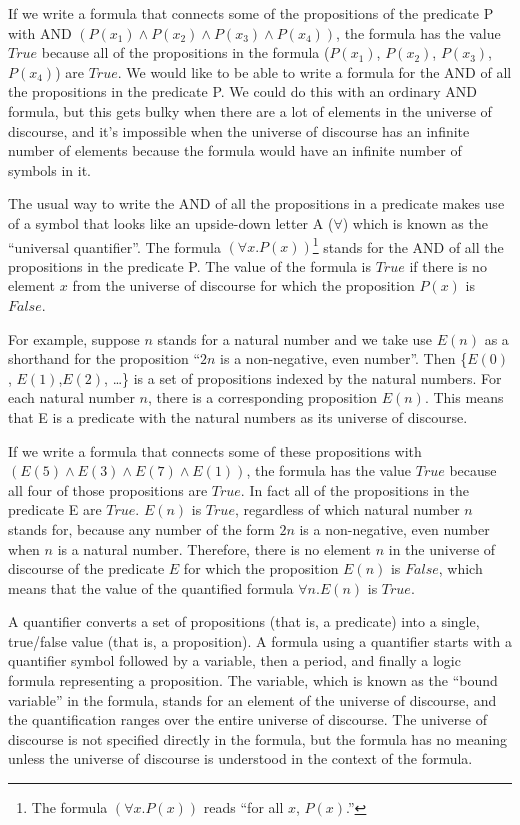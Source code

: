{If we write a formula that connects some of the propositions
of the predicate P with AND
$(P(x_1) \wedge P(x_2) \wedge P(x_3) \wedge P(x_4))$,
the formula has the value $True$
because all of the propositions in the formula ($P(x_1)$, $P(x_2)$, $P(x_3)$, $P(x_4)$)
are $True$.
We would like to be able to write a formula
for the AND of all the propositions in the predicate P.
We could do this with an ordinary AND formula,
but this gets bulky when there are a lot of elements
in the universe of discourse,
and it's impossible when the universe of discourse
has an infinite number of elements because the
formula would have an infinite number of symbols in it.

The usual way to write the AND of all the propositions in a predicate
makes use of a symbol that looks like an upside-down letter A ($\forall$)
which is known as the
\label{def:universal-quantifier}
``universal quantifier''.
The  formula $(\forall x.P(x))$\footnote{The
formula $(\forall x. P(x))$ reads ``for all $x$, $P(x)$.''}
stands for the AND of all the propositions in the predicate P.
The value of the formula is $True$
if there is no element $x$ from the universe of discourse
for which the proposition $P(x)$ is $False$.

For example, suppose $n$ stands for a natural number
and we take use
$E(n)$ as a shorthand for the proposition ``$2n$ is a non-negative, even number''.
Then \{$E(0)$, $E(1)$,$E(2)$, \dots\}
is a set of propositions indexed by the natural numbers.
For each natural number $n$, there is a corresponding proposition $E(n)$.
This means that E is a predicate with the natural numbers
as its universe of discourse.

If we write a formula that connects some of these propositions with
$(E(5) \wedge E(3) \wedge E(7) \wedge E(1))$,
the formula has the value $True$
because all four of those propositions are $True$.
In fact all of the propositions in the predicate E are $True$.
$E(n)$ is $True$, regardless of which natural number $n$ stands for,
because any number of the form $2n$ is a non-negative, even number
when $n$ is a natural number.
Therefore, there is no element $n$ in the universe of discourse of
the predicate $E$ for which the proposition $E(n)$ is $False$,
which means that the value of the quantified formula $\forall n.E(n)$
is $True$.

A
\label{def:quantifier}
quantifier converts a set of propositions (that is, a predicate)
into a single, true/false value (that is, a proposition).
A formula using a quantifier starts with a quantifier symbol followed by
a variable, then a period, and finally a logic formula
representing a proposition. The variable,
which is known as the
\label{def:bound-variable}
``bound variable'' in the formula, stands for an
element of the universe of discourse, and the quantification
ranges over the entire universe of discourse.
The universe of discourse is not specified directly
in the formula, but the formula has no meaning unless
the universe of discourse is understood in the context
of the formula.

}
